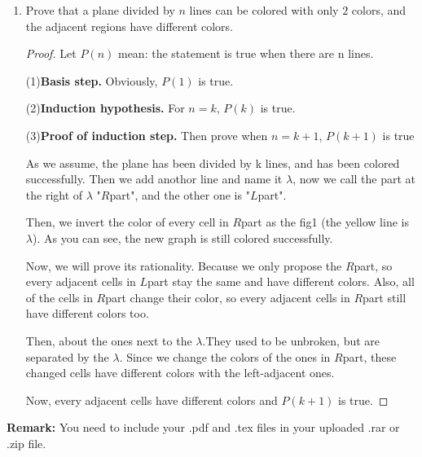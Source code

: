 \documentclass[12pt,a4paper]{article}
\theoremstyle{definition}
\begin{document}
\begin{enumerate}
\begin{proof}
     Then,$$(1+\prod_{j=1}^k p_j) =1+2^{2^1}\times2^{2^2}\times\cdots\times2^{2^k}< 2^{2^1}\times2^{2^1}\times2^{2^2}\times\cdots\times2^{2^k}=2^{2^1+2^1+2^2+\cdots+2^k}=2^{2^{k+1}}$$
     So $p_{k+1}\leq a<2^{2^{k+1}}$. Thus, $P(k+1)$ is true and the statement has been proved.
    
    
    
    \end{proof}

    \item
    Prove that a plane divided by $n$ lines can be colored with only $2$ colors, and the adjacent regions have different colors.
    \begin{proof}
       Let $P(n)$ mean: the statement is true when there are n lines.
       
       (1){\bfseries Basis step.} Obviously, $P(1)$ is true.
       
       (2){\bfseries Induction hypothesis.} For $n=k$,  $P(k)$ is true.
       
       (3){\bfseries Proof of induction step.} Then prove when $n=k+1$, $P(k+1)$ is true
       
 	   As we assume, the plane has been divided by k lines, and has been colored successfully. Then we add anothor line and name it $\lambda$, now we call the part at the right of $\lambda$ "$R$part", and the other one is "$L$part".
       
       Then, we invert the color of every cell in $R$part as the fig1 (the yellow line is $\lambda$). As you can see,  the new graph is still colored successfully.
      
   
       Now, we will prove its rationality. Because we only propose the $R$part, so every adjacent cells in $L$part stay the same and have different colors. Also, all of the cells in $R$part change their color, so every adjacent cells in $R$part still have different colors too.
       
       Then, about the ones next to the $\lambda$.They used to be unbroken, but are separated by the $\lambda$. Since we change the colors of the ones in $R$part, these changed cells have different colors with the left-adjacent ones.
       
       Now, every adjacent cells have different colors and  $P(k+1)$ is true. 
     
       
        
   \end{proof}

\end{enumerate}

\vspace{20pt}

\textbf{Remark:} You need to include your .pdf and .tex files in your uploaded .rar or .zip file.

\end{document}
